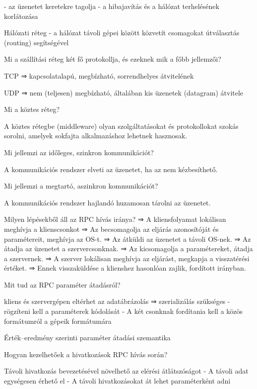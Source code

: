 \documentclass[twoside, a4paper, 12pt]{article}
\begin{document}
\begin{description}
        - az üzenetet keretekre tagolja
        - a hibajavítás és a hálózat terhelésének korlátozása
    \item Hálózati réteg
        - a hálózat távoli gépei között közvetít csomagokat útválasztás (routing) segítségével
    \item  Mi a szállítási réteg két fő protokollja, és ezeknek mik a főbb jellemzői?
    \item TCP ⇒ kapcsolatalapú, megbízható, sorrendhelyes átvitelének
    \item UDP ⇒ nem (teljesen) megbízható, általában kis üzenetek (datagram) átvitele	
    \item  Mi a köztes réteg?
    \item A köztes rétegbe (middleware) olyan szolgáltatásokat és protokollokat szokás sorolni, amelyek sokfajta alkalmazáshoz lehetnek hasznosak.
    \item  Mi jellemzi az időleges, szinkron kommunikációt?
    \item A kommunikációs rendszer elveti az üzenetet, ha az nem kézbesíthető.
    \item  Mi jellemzi a megtartó, aszinkron kommunikációt?
    \item A kommunikációs rendszer hajlandó huzamosan tárolni az üzenetet.
    \item  Milyen lépésekből áll az RPC hívás iránya?
        ⇒ A kliensfolyamat lokálisan meghívja a klienscsonkot
        ⇒ Az becsomagolja az eljárás azonosítóját és paramétereit, meghívja az OS-t.
        ⇒ Az átküldi az üzenetet a távoli OS-nek.
        ⇒ Az átadja az üzenetet a szervercsonknak.
        ⇒ Az kicsomagolja a paramétereket, átadja a szervernek.
        ⇒ A szerver lokálisan meghívja az eljárást, megkapja a visszatérési értéket.
        ⇒ Ennek visszaküldése a klienshez hasonlóan zajlik, fordított irányban.
    \item  Mit tud az RPC paraméter átadásról?
    \item kliens és szervergépen eltérhet az adatábrázolás ⇒ szerializálás szükséges
        - rögzíteni kell a paraméterek kódolását
        - A két csonknak fordítania kell a közös formátumról a gépeik formátumára
    \item Érték–eredmény szerinti paraméter átadási szemantika
    \item  Hogyan kezelhetőek a hivatkozások RPC hívás során?
    \item Távoli hivatkozás bevezetésével növelhető az elérési átlátszóságot
        - A távoli adat egységesen érhető el
        - A távoli hivatkozásokat át lehet paraméterként adni

\end{description}
\end{document}
